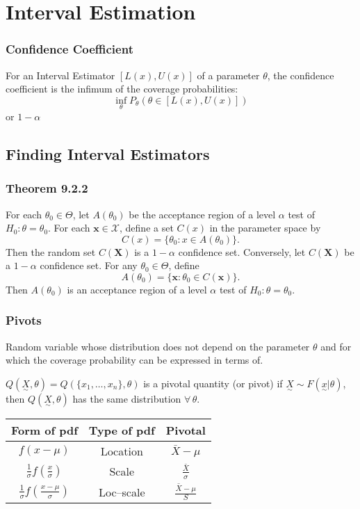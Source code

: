 \section{Interval Estimation}

		\subsubsection{Confidence Coefficient}
			For an Interval Estimator \([L(x),U(x)]\) of a parameter \(\theta\), 
			the confidence coefficient is the infimum of the coverage probabilities:
			$$\inf_\theta P_\theta(\theta\in[L(x),U(x)])$$
			or \(1-\alpha\)

	\subsection{Finding Interval Estimators}
		\subsubsection{Theorem 9.2.2}
			For each $\theta_0 \in\Theta$, let $A(\theta_0)$ be the acceptance region of a level $\alpha$ test of $H_0 : \theta = \theta_0$. For each $\mathbf x\in\mathcal X$, define a set $C(x)$ in the parameter space by
			$$C(x) = \{\theta_0 : x \in A(\theta_0)\}.$$
			Then the random set $C(\mathbf X)$ is a $1-\alpha$ confidence set. Conversely, let $C(\mathbf X)$ be a $1-\alpha$ confidence set. For any $\theta_0\in\Theta$, define
			$$A(\theta_0) = \{\mathbf x: \theta_0\in C(\mathbf x)\}.$$
			Then $A(\theta_0)$ is an acceptance region of a level $\alpha$ test of $H_0:\theta = \theta_0$.
			
		\subsubsection{Pivots}
			Random variable whose distribution does not depend on the parameter $\theta$ 
			and for which the coverage probability can be expressed in terms of.
		
			$Q(\underset{\sim}{X},\theta) = Q(\{x_1,\ldots,x_n\},\theta)$
			is a pivotal quantity (or pivot) if $\underset{\sim}{X} \sim F(\underset{\sim}{x}|\theta)$, 
			then $Q(\underset{\sim}{X},\theta)$ has the same distribution $\forall\,\theta$.
		
			\begin{tabular}{ccc}
				Form of pdf & Type of pdf & Pivotal \\
				\hline
				\(f(x-\mu)\) & Location & \(\bar X-\mu\) \\
				\(\frac{1}{\sigma}f(\frac{x}{\sigma})\) & Scale & \(\frac{\bar X}{\sigma}\) \\
				\(\frac{1}{\sigma}f(\frac{x-\mu}{\sigma})\) & Loc–scale & \(\frac{\bar{X}-\mu}{S}\)
			\end{tabular}
			
